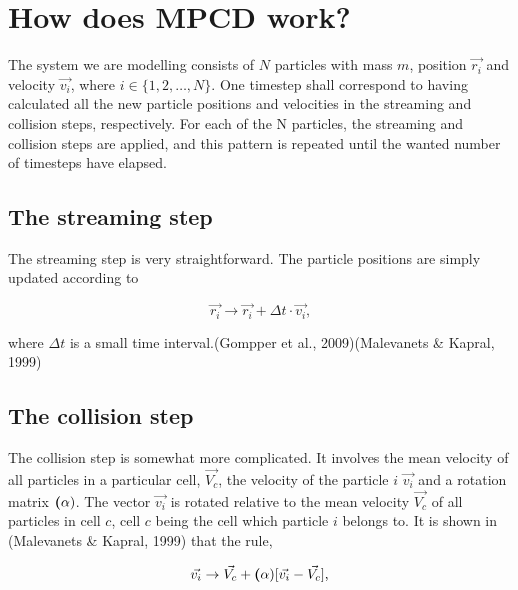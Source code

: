 \documentclass[
]{article}
\begin{document}
\hypertarget{how-does-mpcd-work}{%
\section{How does MPCD work?}\label{how-does-mpcd-work}}

The system we are modelling consists of \(N\) particles with mass \(m\),
position \(\vec{r_{i}}\) and velocity \(\vec{v_{i}}\), where
\(i \in \{1, 2, \dots, N\}\). One timestep shall correspond to having
calculated all the new particle positions and velocities in the
streaming and collision steps, respectively. For each of the N
particles, the streaming and collision steps are applied, and this
pattern is repeated until the wanted number of timesteps have elapsed.

\hypertarget{the-streaming-step}{%
\subsection{The streaming step}\label{the-streaming-step}}

The streaming step is very straightforward. The particle positions are
simply updated according to

\begin{equation}
\vec{r_{i}} \rightarrow \vec{r_{i}} + \Delta t \cdot \vec{v_{i}}\textrm{,}
\end{equation}

where \(\Delta t\) is a small time interval.(Gompper et al.,
2009)(Malevanets \& Kapral, 1999)

\hypertarget{the-collision-step}{%
\subsection{The collision step}\label{the-collision-step}}

The collision step is somewhat more complicated. It involves the mean
velocity of all particles in a particular cell, \(\vec{V_c}\), the
velocity of the particle \(i\) \(\vec{v_i}\) and a rotation matrix
\(\textbf(\alpha)\). The vector \(\vec{v_i}\) is rotated relative to the
mean velocity \(\vec{V_c}\) of all particles in cell \(c\), cell \(c\)
being the cell which particle \(i\) belongs to. It is shown in
(Malevanets \& Kapral, 1999) that the rule,

\begin{equation}
\vec{v_i} \rightarrow \vec{V_c} + \textbf(\alpha) [\vec{v_i} - \vec{V_c}] \textrm{,}
\end{equation}
\end{document}
